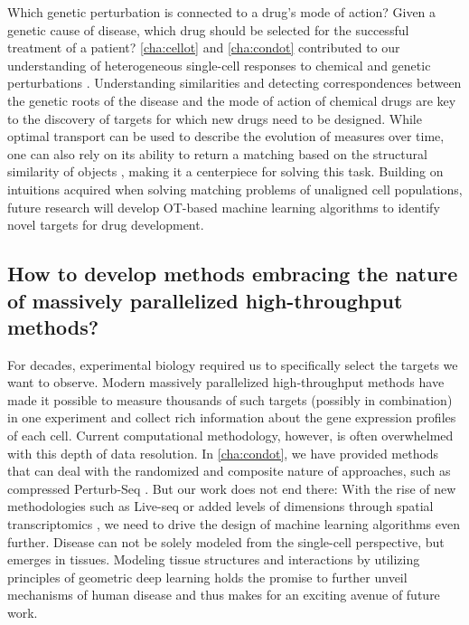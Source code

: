 Which genetic perturbation is connected to a drug's mode of action? Given a genetic cause of disease, which drug should be selected for the successful treatment of a patient?
\cref{cha:cellot} and \cref{cha:condot} contributed to our understanding of heterogeneous single-cell responses to chemical and genetic perturbations \citep[]{bunne2019learning, bunne2022supervised}.
Understanding similarities and detecting correspondences between the genetic roots of the disease and the mode of action of chemical drugs are key to the discovery of targets for which new drugs need to be designed.
While optimal transport can be used to describe the evolution of measures over time, one can also rely on its ability to return a matching based on the structural similarity of objects \citep{memoli2011gromov, bunne2019learning}, making it a centerpiece for solving this task.
Building on intuitions acquired when solving matching problems of unaligned cell populations, future research will develop OT-based machine learning algorithms to identify novel targets for drug development.


\subsection*{\textbf{How to develop methods embracing the nature of massively parallelized high-throughput methods?}}

For decades, experimental biology required us to specifically select the targets we want to observe. Modern massively parallelized high-throughput methods have made it possible to measure thousands of such targets (possibly in combination) in one experiment and collect rich information about the gene expression profiles of each cell.
Current computational methodology, however, is often overwhelmed with this depth of data resolution.
In \cref{cha:condot}, we have provided methods that can deal with the randomized and composite nature of approaches, such as compressed Perturb-Seq \citep{dixit2016perturb, cleary2017efficient, cleary2020necessity, roohani2022gears}.
But our work does not end there: With the rise of new methodologies such as Live-seq \citep[\cref{sec:sbalign}]{chen2022live} or added levels of dimensions through spatial transcriptomics \citep{marx2021method}, we need to drive the design of machine learning algorithms even further. Disease can not be solely modeled from the single-cell perspective, but emerges in tissues. Modeling tissue structures and interactions by utilizing principles of geometric deep learning \citep{fischer2023modeling} holds the promise to further unveil mechanisms of human disease and thus makes for an exciting avenue of future work.


